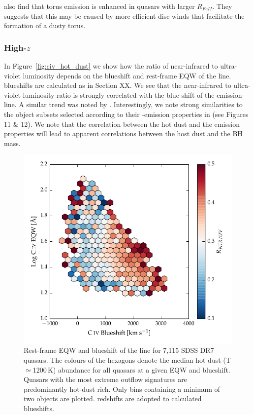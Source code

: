 \citet{shen14} also find that torus emission is enhanced in quasars with larger $R_{FeII}$.
They suggests that this may be caused by more efficient disc winds that facilitate the formation of a dusty torus. 

\subsubsection{High-$z$}

In Figure~\ref{fig:civ_hot_dust} we show how the ratio of near-infrared to ultra-violet luminosity depends on the blueshift and rest-frame EQW of the  line.
 blueshifts are calculated as in Section XX. 
We see that the near-infrared to ultra-violet luminosity ratio is strongly correlated with the blue-shift of the  emission-line. 
A similar trend was noted by \citet{wang13}. 
Interestingly, we note strong similarities to the object subsets selected according to their -emission properties in \citet{richards11} (see Figures 11 \& 12).  
We note that the correlation between the hot dust and the  emission properties will lead to apparent correlations between the host dust and the BH mass. 
 
\begin{figure}
\centering
  \includegraphics[width=\columnwidth]{figures/chapter05/hot_dust_beta.pdf}
\caption[{Hot dust abundance as a function of rest-frame EQW and blueshift of the  line.}]{Rest-frame EQW and blueshift of the  line for 7,115 SDSS DR7 quasars. The colours of the hexagons denote the median hot dust (T$\simeq$1200\,K) abundance for all quasars at a given EQW and blueshift. Quasars with the most extreme outflow signatures are predominantly hot-dust rich. Only bins containing a minimum of two objects are plotted. \citet{hewett10} redshifts are adopted to calculated  blueshifts.}
  \label{fig:hot_dust_beta}
\end{figure}

